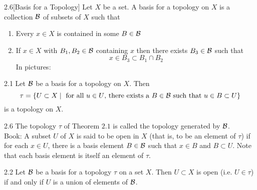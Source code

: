 \begin{customdefinition}{2.6}[Basis for a Topology]
Let $X$ be a set. A basis for a topology on $X$ is a collection $\mathcal{B}$ of subsets of $X$ such that
\begin{enumerate}
    \item[1).] Every $x \in X$ is contained in some $B \in \mathcal{B}$
    \item[2).] If $x\in X$ with $B_1, B_2 \in \mathcal{B}$ containing $x$ then there exists $B_3 \in \mathcal{B}$ such that 
                $$x\in B_3 \subset B_1 \cap B_2$$
                In pictures:
                \begin{center}
                \end{center}
    \end{enumerate} 
\end{customdefinition}


\begin{customthm}{2.1}
Let $\mathcal{B}$ be a basis for a topology on $X$. Then 
$$\tau = \left\{U \subset X \mid \text{ for all $u \in U$, there exists a $B \in \mathcal{B}$ such that $u \in B \subset U$}\right\}$$
is a topology on $X$.
\end{customthm}

\begin{customdefinition}{2.6}
The topology $\tau$ of Theorem $2.1$ is called the topology generated by $\mathcal{B}$.\\
Book: A subset $U$ of $X$ is said to be open in $X$ (that is, to be an element of $\tau$) if for each $x\in U$, there is a basis element $B \in \mathcal{B}$ such that $x \in B$ and $B \subset U$. Note that each basis element is itself an element of $\tau$.
\end{customdefinition}

\begin{customlemma}{2.2}
Let $\mathcal{B}$ be a basis for a topology $\tau$ on a set $X$. Then $U \subset X$ is open (i.e. $U\in \tau$) if and only if $U$ is a union of elements of $\mathcal{B}$.
\end{customlemma}

